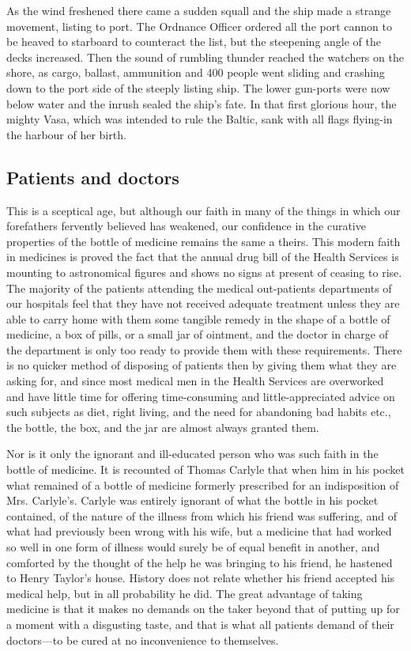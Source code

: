 \documentclass[11pt]{article}
\begin{document}
As the wind freshened there came a sudden squall and the ship made a strange movement, listing to port. The Ordnance Officer ordered all the port cannon to be heaved to starboard to counteract the list, but the steepening angle of the decks increased. Then the sound of rumbling thunder reached the watchers on the shore, as cargo, ballast, ammunition and 400 people went sliding and crashing down to the port side of the steeply listing ship. The lower gun-ports were now below water and the inrush sealed the ship's fate. In that first glorious hour, the mighty Vasa, which was intended to rule the Baltic, sank with all flags flying-in the harbour of her birth.
\subsection{Patients and doctors}
\label{sec-2-28}

This is a sceptical age, but although our faith in many of the things in which our forefathers fervently believed has weakened, our confidence in the curative properties of the bottle of medicine remains the same a theirs. This modern faith in medicines is proved the fact that the annual drug bill of the Health Services is mounting to astronomical figures and shows no signs at present of ceasing to rise. The majority of the patients attending the medical out-patients departments of our hospitals feel that they have not received adequate treatment unless they are able to carry home with them some tangible remedy in the shape of a bottle of medicine, a box of pills, or a small jar of ointment, and the doctor in charge of the department is only too ready to provide them with these requirements. There is no quicker method of disposing of patients then by giving them what they are asking for, and since most medical men in the Health Services are overworked and have little time for offering time-consuming and little-appreciated advice on such subjects as diet, right living, and the need for abandoning bad habits etc., the bottle, the box, and the jar are almost always granted them.

Nor is it only the ignorant and ill-educated person who was such faith in the bottle of medicine. It is recounted of Thomas Carlyle that when him in his pocket what remained of a bottle of medicine formerly prescribed for an indisposition of Mrs. Carlyle's. Carlyle was entirely ignorant of what the bottle in his pocket contained, of the nature of the illness from which his friend was suffering, and of what had previously been wrong with his wife, but a medicine that had worked so well in one form of illness would surely be of equal benefit in another, and comforted by the thought of the help he was bringing to his friend, he hastened to Henry Taylor's house. History does not relate whether his friend accepted his medical help, but in all probability he did. The great advantage of taking medicine is that it makes no demands on the taker beyond that of putting up for a moment with a disgusting taste, and that is what all patients demand of their doctors---to be cured at no inconvenience to themselves.
\end{document}
